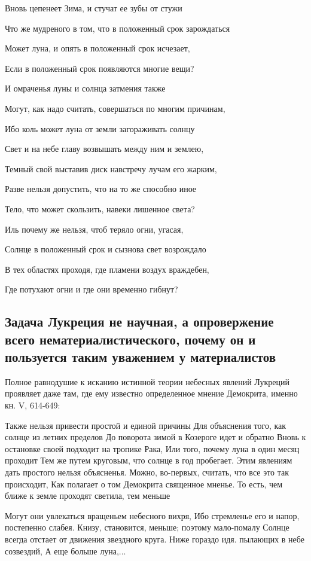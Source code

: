 Вновь цепенеет Зима, и стучат ее зубы от стужи

Что же мудреного в том, что в положенный срок зарождаться

Может луна, и опять в положенный срок исчезает,

Если в положенный срок появляются многие вещи?

И омраченья луны и солнца затмения также

Могут, как надо считать, совершаться по многим причинам,

Ибо коль может луна от земли загораживать солнцу

Свет и на небе главу возвышать между ним и землею,

Темный свой выставив диск навстречу лучам его жарким,

Разве нельзя допустить, что на то же способно иное

Тело, что может скользить, навеки лишенное света?

Иль почему же нельзя, чтоб теряло огни, угасая,

Солнце в положенный срок и сызнова свет возрождало

В тех областях проходя, где пламени воздух враждебен,

Где потухают огни и где они временно гибнут?

\subsection{Задача Лукреция не научная, а опровержение всего
нематериалистического, почему он и пользуется таким уважением у
материалистов}

Полное равнодушие к исканию истинной теории небесных явлений
Лукреций проявляет даже там, где ему известно определенное мнение
Демокрита, именно кн. V, 614-649:

Также нельзя привести простой и единой причины
Для объяснения того, как солнце из летних пределов
До поворота зимой в Козероге идет и обратно
Вновь к остановке своей подходит на тропике Рака,
Или того, почему луна в один месяц проходит
Тем же путем круговым, что солнце в год пробегает.
Этим явлениям дать простого нельзя объясненья.
Можно, во-первых, считать, что все это так происходит,
Как полагает о том Демокрита священное мненье.
То есть, чем ближе к земле проходят светила, тем меньше

Могут они увлекаться вращеньем небесного вихря, Ибо стремленье его и
напор, постепенно слабея. Книзу, становится, меньше; поэтому
мало-помалу Солнце всегда отстает от движения звездного круга. Ниже
гораздо идя. пылающих в небе созвездий, А еще больше луна,...

